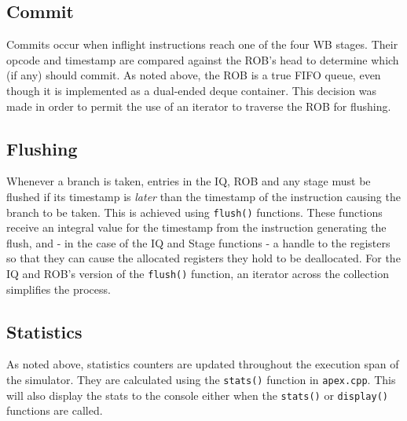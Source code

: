 \documentclass[12pt]{article}
\begin{document}
\subsection{Commit}
Commits occur when inflight instructions reach one of the four WB stages. 
Their opcode and timestamp are compared against the ROB's head to determine which (if any) should commit. 
As noted above, the ROB is a true FIFO queue, even though it is implemented as a dual-ended deque container.
This decision was made in order to permit the use of an iterator to traverse the ROB for flushing.

\subsection{Flushing}
Whenever a branch is taken, entries in the IQ, ROB and any stage must be flushed if its timestamp is \textit{later} than the timestamp of the instruction causing the branch to be taken. 
This is achieved using \texttt{flush()} functions. 
These functions receive an integral value for the timestamp from the instruction generating the flush, and \-- in the case of the IQ and Stage functions \-- a handle to the registers so that they can cause the allocated registers they hold to be deallocated.
For the IQ and ROB's version of the \texttt{flush()} function, an iterator across the collection simplifies the process.

\subsection{Statistics}
As noted above, statistics counters are updated throughout the execution span of the simulator. They are calculated using the \texttt{stats()} function in \texttt{apex.cpp}. 
This will also display the stats to the console either when the \texttt{stats()} or \texttt{display()} functions are called. 


\end{document}
